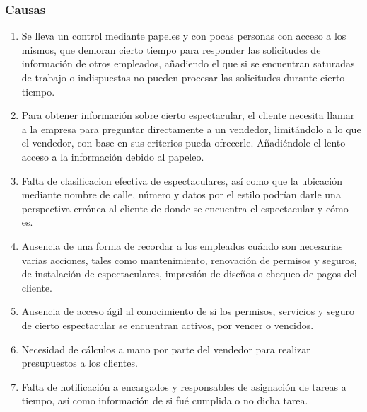 \subsubsection{Causas}

\begin{enumerate}
	\item Se lleva un control mediante papeles y con pocas personas con acceso a los mismos, que demoran cierto tiempo para responder las solicitudes de información de otros empleados, añadiendo el que si se encuentran saturadas de trabajo o indispuestas no pueden procesar las solicitudes durante cierto tiempo.
	\item Para obtener información sobre cierto espectacular, el cliente necesita llamar a la empresa para preguntar directamente a un vendedor, limitándolo a lo que el vendedor, con base en sus criterios pueda ofrecerle. Añadiéndole el lento acceso a la información debido al papeleo.
	\item Falta de clasificacion efectiva de espectaculares, así como que la ubicación mediante nombre de calle, número y datos por el estilo podrían darle una perspectiva errónea al cliente de donde se encuentra el espectacular y cómo es.
	\item Ausencia de una forma de recordar a los empleados cuándo son necesarias varias acciones, tales como mantenimiento, renovación de permisos y seguros, de instalación de espectaculares, impresión de diseños o chequeo de pagos del cliente.
	\item Ausencia de acceso ágil al conocimiento de si los permisos, servicios y seguro de cierto espectacular se encuentran activos, por vencer o vencidos.
	\item Necesidad de cálculos a mano por parte del vendedor para realizar presupuestos a los clientes.
	\item Falta de notificación a encargados y responsables de asignación de tareas a tiempo, así como información de si fué cumplida o no dicha tarea.
\end{enumerate}